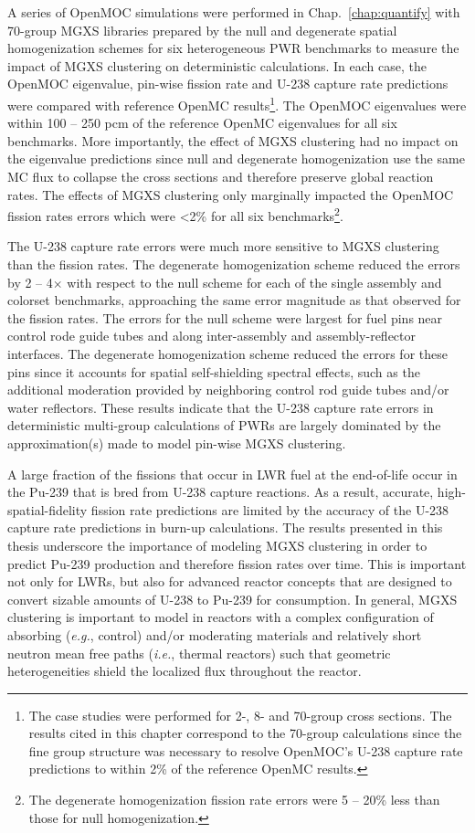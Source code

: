 A series of OpenMOC simulations were performed in Chap.~\ref{chap:quantify} with 70-group \ac{MGXS} libraries prepared by the null and degenerate spatial homogenization schemes for six heterogeneous \ac{PWR} benchmarks to measure the impact of \ac{MGXS} clustering on deterministic calculations. In each case, the OpenMOC eigenvalue, pin-wise fission rate and U-238 capture rate predictions were compared with reference OpenMC results\footnote{The case studies were performed for 2-, 8- and 70-group cross sections. The results cited in this chapter correspond to the 70-group calculations since the fine group structure was necessary to resolve OpenMOC's U-238 capture rate predictions to within 2\% of the reference OpenMC results. }. The OpenMOC eigenvalues were within 100 -- 250 \ac{pcm} of the reference OpenMC eigenvalues for all six benchmarks. More importantly, the effect of \ac{MGXS} clustering had no impact on the eigenvalue predictions since null and degenerate homogenization use the same \ac{MC} flux to collapse the cross sections and therefore preserve global reaction rates. The effects of \ac{MGXS} clustering only marginally impacted the OpenMOC fission rates errors which were <2\% for all six benchmarks\footnote{The degenerate homogenization fission rate errors were 5 -- 20\% less than those for null homogenization.}.

The U-238 capture rate errors were much more sensitive to \ac{MGXS} clustering than the fission rates. The degenerate homogenization scheme reduced the errors by 2 -- 4$\times$ with respect to the null scheme for each of the single assembly and colorset benchmarks, approaching the same error magnitude as that observed for the fission rates. The errors for the null scheme were largest for fuel pins near control rode guide tubes and along inter-assembly and assembly-reflector interfaces. The degenerate homogenization scheme reduced the errors for these pins since it accounts for spatial self-shielding spectral effects, such as the additional moderation provided by neighboring control rod guide tubes and/or water reflectors. These results indicate that the U-238 capture rate errors in deterministic multi-group calculations of \acp{PWR} are largely dominated by the approximation(s) made to model pin-wise \ac{MGXS} clustering.

A large fraction of the fissions that occur in \ac{LWR} fuel at the end-of-life occur in the Pu-239 that is bred from U-238 capture reactions. As a result, accurate, high-spatial-fidelity fission rate predictions are limited by the accuracy of the U-238 capture rate predictions in burn-up calculations. The results presented in this thesis underscore the importance of modeling \ac{MGXS} clustering in order to predict Pu-239 production and therefore fission rates over time. This is important not only for \acp{LWR}, but also for advanced reactor concepts that are designed to convert sizable amounts of U-238 to Pu-239 for consumption. In general, \ac{MGXS} clustering is important to model in reactors with a complex configuration of absorbing (\textit{e.g.}, control) and/or moderating materials and relatively short neutron mean free paths (\textit{i.e.}, thermal reactors) such that geometric heterogeneities shield the localized flux throughout the reactor.

